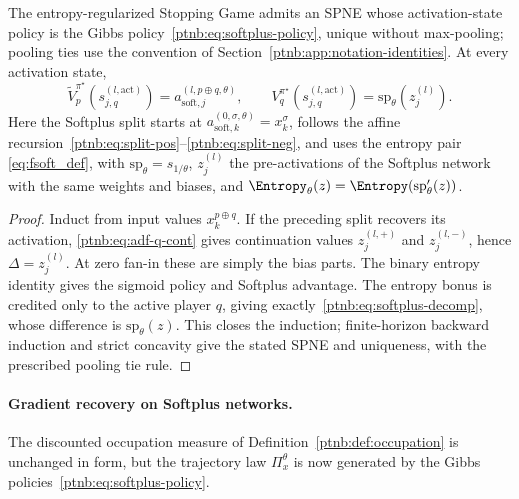 \begin{theoremenv}\label{ptnb:thm:softplus-forward}\label{prop:softplus_game}
The entropy-regularized Stopping Game admits an SPNE whose activation-state policy is the Gibbs policy~\eqref{ptnb:eq:softplus-policy},
unique without max-pooling; pooling ties use the convention of Section~\ref{ptnb:app:notation-identities}.
At every activation state,
\begin{equation}\label{ptnb:eq:softplus-spne-tildes}
    \tilde V_p^{\pi^\star}(s_{j,q}^{(l,\mathrm{act})})
       =a_{\mathrm{soft},j}^{(l,p\oplus q,\theta)},\qquad
    V_q^{\pi^\star}(s_{j,q}^{(l,\mathrm{act})})=\mathrm{sp}_\theta(z_j^{(l)}).
\end{equation}
Here the Softplus split starts at $a_{\mathrm{soft},k}^{(0,\sigma,\theta)}=x_k^\sigma$, follows the affine
recursion~\eqref{ptnb:eq:split-pos}--\eqref{ptnb:eq:split-neg}, and uses the entropy pair
\eqref{eq:fsoft_def}, with $\mathrm{sp}_\theta=s_{1/\theta}$, $z_j^{(l)}$ the pre-activations of the Softplus network with the same weights and biases, and
$\Entropy_\theta(z)=\Entropy(\mathrm{sp}'_\theta(z))$.
\end{theoremenv}
\begin{proof}
Induct from input values $x_k^{p\oplus q}$. If the preceding split recovers its activation,
\eqref{ptnb:eq:adf-q-cont} gives continuation values $z_j^{(l,+)}$ and $z_j^{(l,-)}$, hence
$\Delta=z_j^{(l)}$. At zero fan-in these are simply the bias parts. The binary entropy identity
gives the sigmoid policy and Softplus advantage. The entropy bonus is credited only to the active player $q$, giving exactly~\eqref{ptnb:eq:softplus-decomp}, whose difference is $\mathrm{sp}_\theta(z)$.
This closes the induction; finite-horizon backward induction and strict concavity give the stated
SPNE and uniqueness, with the prescribed pooling tie rule.
\end{proof}

\paragraph{Gradient recovery on Softplus networks.}\label{ptnb:app:softplus-gradient}
The discounted occupation measure of Definition~\ref{ptnb:def:occupation} is unchanged in form, but the
trajectory law $\Pi_x^\theta$ is now generated by the Gibbs policies~\eqref{ptnb:eq:softplus-policy}.

